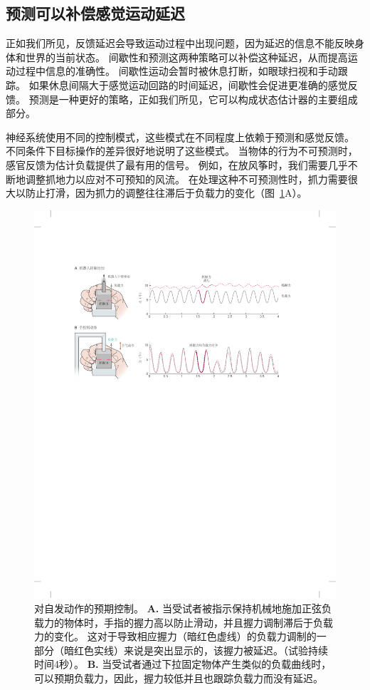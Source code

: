 \subsection{预测可以补偿感觉运动延迟}

正如我们所见，反馈延迟会导致运动过程中出现问题，因为延迟的信息不能反映身体和世界的当前状态。
间歇性和预测这两种策略可以补偿这种延迟，从而提高运动过程中信息的准确性。
间歇性运动会暂时被休息打断，如眼球扫视和手动跟踪。
如果休息间隔大于感觉运动回路的时间延迟，间歇性会促进更准确的感觉反馈。
预测是一种更好的策略，正如我们所见，它可以构成状态估计器的主要组成部分。


神经系统使用不同的控制模式，这些模式在不同程度上依赖于预测和感觉反馈。
不同条件下目标操作的差异很好地说明了这些模式。
当物体的行为不可预测时，感官反馈为估计负载提供了最有用的信号。
例如，在放风筝时，我们需要几乎不断地调整抓地力以应对不可预知的风流。 
在处理这种不可预测性时，抓力需要很大以防止打滑，因为抓力的调整往往滞后于负载力的变化（图~\ref{fig:30_6}A）。


\begin{figure}[htbp]
	\centering
	\includegraphics[width=1.0\linewidth]{chap30/fig_30_6}
	\caption{对自发动作的预期控制\cite{blakemore1998predicting}。
		\textbf{A.} 当受试者被指示保持机械地施加正弦负载力的物体时，手指的握力高以防止滑动，并且握力调制滞后于负载力的变化。
		这对于导致相应握力（暗红色虚线）的负载力调制的一部分（暗红色实线）来说是突出显示的，该握力被延迟。（试验持续时间4秒）。
		\textbf{B.} 当受试者通过下拉固定物体产生类似的负载曲线时，可以预期负载力，因此，握力较低并且也跟踪负载力而没有延迟。}
	\label{fig:30_6}
\end{figure}


